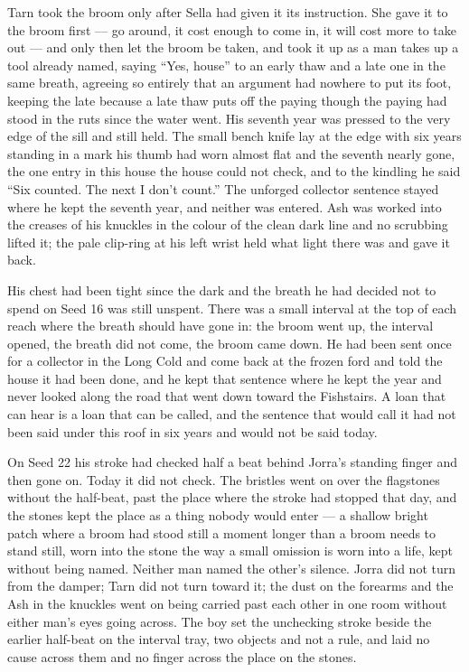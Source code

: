 Tarn took the broom only after Sella had given it its instruction. She gave it to the broom first --- go around, it cost enough to come in, it will cost more to take out --- and only then let the broom be taken, and  took it up as a man takes up a tool already named, saying “Yes, house” to an early thaw and a late one in the same breath, agreeing so entirely that an argument had nowhere to put its foot, keeping the late because a late thaw puts off the paying though the paying had stood in the ruts since the water went. His seventh year was pressed to the very edge of the sill and still held. The small bench knife lay at the edge with six years standing in a mark his thumb had worn almost flat and the seventh nearly gone, the one entry in this house the house could not check, and to the kindling he said “Six counted. The next I don't count.” The unforged collector sentence stayed where he kept the seventh year, and neither was entered. Ash was worked into the creases of his knuckles in the colour of the clean dark line and no scrubbing lifted it; the pale clip-ring at his left wrist held what light there was and gave it back.

His chest had been tight since the dark and the breath he had decided not to spend on Seed 16 was still unspent. There was a small interval at the top of each reach where the breath should have gone in: the broom went up, the interval opened, the breath did not come, the broom came down. He had been sent once for a collector in the Long Cold and come back at the frozen ford and told the house it had been done, and he kept that sentence where he kept the year and never looked along the road that went down toward the Fishstairs. A loan that can hear is a loan that can be called, and the sentence that would call it had not been said under this roof in six years and would not be said today.

On Seed 22 his stroke had checked half a beat behind Jorra's standing finger and then gone on. Today it did not check. The bristles went on over the flagstones without the half-beat, past the place where the stroke had stopped that day, and the stones kept the place as a thing nobody would enter --- a shallow bright patch where a broom had stood still a moment longer than a broom needs to stand still, worn into the stone the way a small omission is worn into a life, kept without being named. Neither man named the other's silence. Jorra did not turn from the damper; Tarn did not turn toward it; the dust on the forearms and the Ash in the knuckles went on being carried past each other in one room without either man's eyes going across. The boy set the unchecking stroke beside the earlier half-beat on the interval tray, two objects and not a rule, and laid no cause across them and no finger across the place on the stones.

